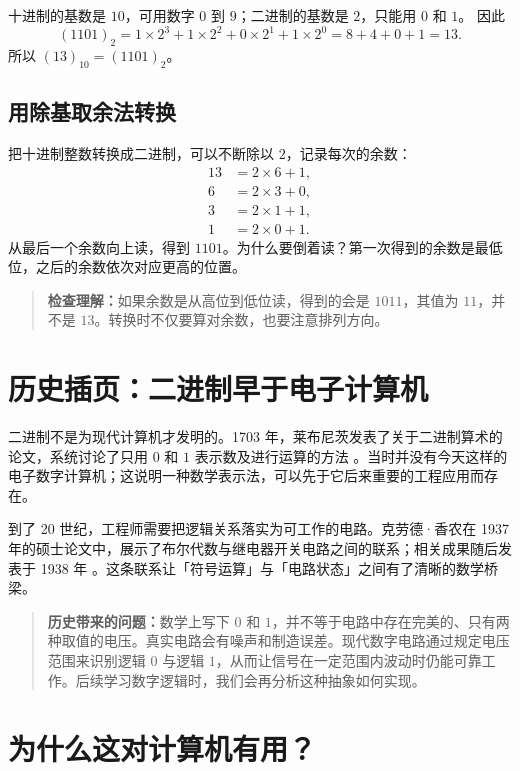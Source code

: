 \documentclass[12pt,a4paper]{ctexart}
\begin{document}
十进制的基数是 $10$，可用数字 $0$ 到 $9$；二进制的基数是 $2$，只能用 $0$ 和 $1$。
因此
\[
    (1101)_2
    =1\times 2^3+1\times 2^2+0\times 2^1+1\times 2^0
    =8+4+0+1
    =13.
\]
所以 $(13)_{10}=(1101)_2$。

\subsection{用除基取余法转换}

把十进制整数转换成二进制，可以不断除以 $2$，记录每次的余数：
\[
\begin{aligned}
13 &= 2\times 6 + 1,\\
 6 &= 2\times 3 + 0,\\
 3 &= 2\times 1 + 1,\\
 1 &= 2\times 0 + 1.
\end{aligned}
\]
从最后一个余数向上读，得到 $1101$。为什么要倒着读？第一次得到的余数是最低位，之后的余数依次对应更高的位置。

\begin{quote}
\textbf{检查理解：}如果余数是从高位到低位读，得到的会是 $1011$，其值为 $11$，并不是 $13$。转换时不仅要算对余数，也要注意排列方向。
\end{quote}

\section{历史插页：二进制早于电子计算机}

二进制不是为现代计算机才发明的。1703 年，莱布尼茨发表了关于二进制算术的论文，系统讨论了只用 $0$ 和 $1$ 表示数及进行运算的方法 \cite{leibniz1703}。当时并没有今天这样的电子数字计算机；这说明一种数学表示法，可以先于它后来重要的工程应用而存在。

到了 20 世纪，工程师需要把逻辑关系落实为可工作的电路。克劳德·香农在 1937 年的硕士论文中，展示了布尔代数与继电器开关电路之间的联系；相关成果随后发表于 1938 年 \cite{shannon1938}。这条联系让「符号运算」与「电路状态」之间有了清晰的数学桥梁。

\begin{quote}
\textbf{历史带来的问题：}数学上写下 $0$ 和 $1$，并不等于电路中存在完美的、只有两种取值的电压。真实电路会有噪声和制造误差。现代数字电路通过规定电压范围来识别逻辑 $0$ 与逻辑 $1$，从而让信号在一定范围内波动时仍能可靠工作。后续学习数字逻辑时，我们会再分析这种抽象如何实现。
\end{quote}

\section{为什么这对计算机有用？}
\end{document}
